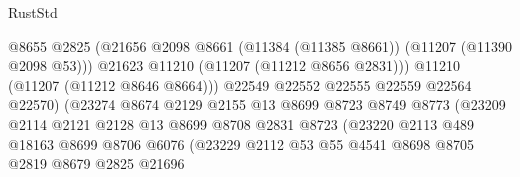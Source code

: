 \begin{lexlean}{RustStd}
\begin{coremodule}
                                          @8655
                                          @2825
                                          (@21656
                                            @2098
                                            @8661
                                            (@11384 (@11385 @8661))
                                            (@11207 (@11390 @2098 @53)))
                                          @21623
                                          @11210
                                          (@11207 (@11212 @8656 @2831)))
                                        @11210
                                        (@11207 (@11212 @8646 @8664)))
                                      @22549
                                      @22552
                                      @22555
                                      @22559
                                      @22564
                                      @22570)
                                    (@23274
                                      @8674
                                      @2129
                                      @2155
                                      @13
                                      @8699
                                      @8723
                                      @8749
                                      @8773
                                      (@23209
                                        @2114
                                        @2121
                                        @2128
                                        @13
                                        @8699
                                        @8708
                                        @2831
                                        @8723
                                        (@23220
                                          @2113
                                          @489
                                          @18163
                                          @8699
                                          @8706
                                          @6076
                                          (@23229
                                            @2112
                                            @53
                                            @55
                                            @4541
                                            @8698
                                            @8705
                                            @2819
                                            @8679
                                            @2825
                                            @21696

\end{coremodule}
\end{lexlean}
